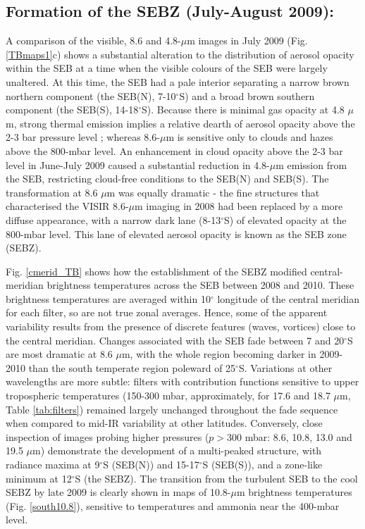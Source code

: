 \documentclass[final,5p,times,twocolumn,authoryear]{elsarticle}
\newcommand{\degree}{\ensuremath{^\circ}}
\begin{document}

\subsection{Formation of the SEBZ (July-August 2009):}

A comparison of the visible, 8.6 and 4.8-$\mu$m images in July 2009 (Fig. \ref{TBmaps1}c) shows a substantial alteration to the distribution of aerosol opacity within the SEB at a time when the visible colours of the SEB were largely unaltered.  At this time, the SEB had a pale interior separating a narrow brown northern component (the SEB(N), 7-10$^\circ$S) and a broad brown southern component (the SEB(S), 14-18$^\circ$S).  Because there is minimal gas opacity at 4.8 $\mu$m, strong thermal emission implies a relative dearth of aerosol opacity above the 2-3 bar pressure level \citep[e.g.,][]{98roos-serote}; whereas 8.6-$\mu$m is sensitive only to clouds and hazes above the 800-mbar level.  An enhancement in cloud opacity above the 2-3 bar level in June-July 2009 caused a substantial reduction in 4.8-$\mu$m emission from the SEB, restricting cloud-free conditions to the SEB(N) and SEB(S).  The transformation at 8.6 $\mu$m was equally dramatic - the fine structures that characterised the VISIR 8.6-$\mu$m imaging in 2008 had been replaced by a more diffuse appearance, with a narrow dark lane (8-13$^\circ$S) of elevated opacity at the 800-mbar level.  This lane of elevated aerosol opacity is known as the SEB zone (SEBZ).

Fig. \ref{cmerid_TB} shows how the establishment of the SEBZ modified central-meridian brightness temperatures across the SEB between 2008 and 2010.  These brightness temperatures are averaged within 10$^\circ$ longitude of the central meridian for each filter, so are not true zonal averages.  Hence, some of the apparent variability results from the presence of discrete features (waves, vortices) close to the central meridian.  Changes associated with the SEB fade between 7 and 20\degree S are most dramatic at 8.6 $\mu$m, with the whole region becoming darker in 2009-2010 than the south temperate region poleward of 25\degree S.  Variations at other wavelengths are more subtle:  filters with contribution functions sensitive to upper tropospheric temperatures (150-300 mbar, approximately, for 17.6 and 18.7 $\mu$m, Table \ref{tab:filters}) remained largely unchanged throughout the fade sequence when compared to mid-IR variability at other latitudes.  Conversely, close inspection of images probing higher pressures ($p>300$ mbar: 8.6, 10.8, 13.0 and 19.5 $\mu$m) demonstrate the development of a multi-peaked structure, with radiance maxima at 9\degree S (SEB(N)) and 15-17\degree S (SEB(S)), and a zone-like minimum at 12\degree S (the SEBZ).  The transition from the turbulent SEB to the cool SEBZ by late 2009 is clearly shown in maps of 10.8-$\mu$m brightness temperatures (Fig. \ref{south10.8}), sensitive to temperatures and ammonia near the 400-mbar level. 
\end{document}
